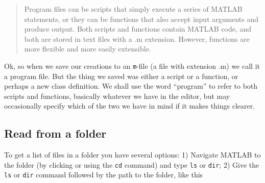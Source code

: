 \begin{quote}
Program files can be scripts that simply execute a series of MATLAB statements, or they can be functions that also accept input arguments and produce output. Both scripts and functions contain MATLAB code, and both are stored in text files with a .m extension. However, functions are more flexible and more easily extensible.
\end{quote}

Ok, so when we save our creations to an \lstinline{m}-file (a file with extension .m) we call it a program file.
But the thing we saved was either a script or a function, or perhaps a new class definition.
We shall use the word ``program'' to refer to both scripts and functions, basically whatever we have in the editor, but may occasionally specify which of the two we have in mind if it makes things clearer.

\subsection{Read from a folder}
To get a list of files in a folder you have several options: 1) Navigate MATLAB to the folder (by clicking or using the \lstinline{cd} command) and type \lstinline{ls} or \lstinline{dir}; 2)
Give the \lstinline{ls} or \lstinline{dir} command followed by the path to the folder, like this